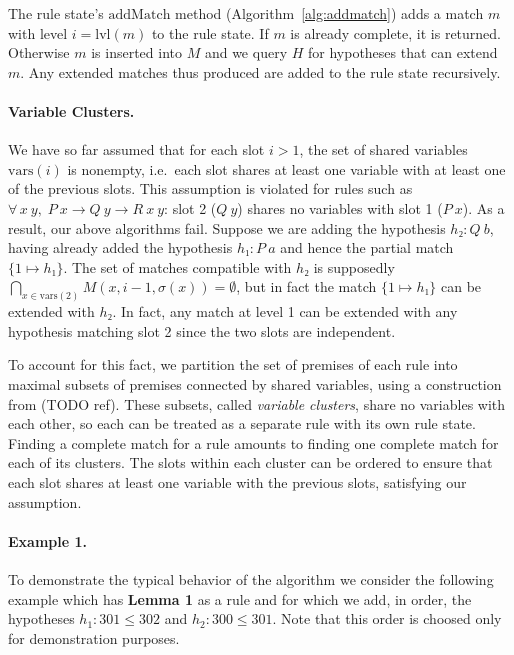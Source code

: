 \documentclass[runningheads]{llncs}
\newcommand{\xcom}[1]{{\color{cyan}{Xavier: #1}} }
\newcommand{\jcom}[1]{{\color{orange}{Jannis: #1}} }
\newcommand{\All}[2]{\ensuremath{\forall\, #1,\; #2}}
\newcommand{\vars}{\ensuremath{\mathrm{vars}}}
\newcommand{\lvl}{\ensuremath{\mathrm{lvl}}}
\newcommand{\addMatch}{\ensuremath{\mathrm{addMatch}}}
\begin{document}
The rule state's $\addMatch$ method (Algorithm~\ref{alg:addmatch}) adds a match $m$ with level $i = \lvl(m)$ to the rule state.
If $m$ is already complete, it is returned.
Otherwise $m$ is inserted into $M$ and we query $H$ for hypotheses that can extend $m$.
Any extended matches thus produced are added to the rule state recursively.

\paragraph{Variable Clusters.}
We have so far assumed that for each slot $i > 1$, the set of shared variables $\vars(i)$ is nonempty, i.e.\ each slot shares at least one variable with at least one of the previous slots.
This assumption is violated for rules such as $\All{x~y}{P~x → Q~y → R~x~y}$: slot 2 ($Q~y$) shares no variables with slot 1 ($P~x$).
As a result, our above algorithms fail.
Suppose we are adding the hypothesis $h₂ : Q~b$, having already added the hypothesis $h₁ : P~a$ and hence the partial match $\{1 ↦ h₁\}$.
The set of matches compatible with $h₂$ is supposedly $\bigcap_{x \in \vars(2)} M(x, i-1, σ(x)) = ∅$, but in fact the match $\{1 ↦ h₁\}$ can be extended with $h₂$.
In fact, any match at level 1 can be extended with any hypothesis matching slot 2 since the two slots are independent.

To account for this fact, we partition the set of premises of each rule into maximal subsets of premises connected by shared variables, using a construction from (TODO ref).
These subsets, called \emph{variable clusters}, share no variables with each other, so each can be treated as a separate rule with its own rule state.
Finding a complete match for a rule amounts to finding one complete match for each of its clusters.
The slots within each cluster can be ordered to ensure that each slot shares at least one variable with the previous slots, satisfying our assumption.

\paragraph{Example 1.}
\xcom{Technically, it is useless to save level 1 hyps in $\eta_x$. Should we remove them from the examples?.} \jcom{Yes, since the previous section now contains this optimisation.}
To demonstrate the typical behavior of the algorithm we consider the following example which has \textbf{Lemma 1} as a rule and for which we add, in order, the hypotheses $h_1 : 301 \leq 302$ and $h_2 : 300 \leq 301$.
Note that this order is choosed only for demonstration purposes.
\end{document}
